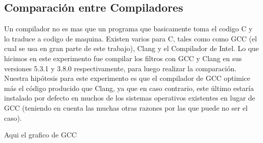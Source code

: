 \subsection{Comparación entre Compiladores}
Un compilador no es mas que un programa que basicamente toma el codigo C
y lo traduce a codigo de maquina. Existen varios para C, tales como como GCC (el cual se usa en gran parte de este trabajo), Clang y el Compilador de Intel.
Lo que hicimos en este experimento fue compilar los filtros con GCC y Clang en sus versiones 5.3.1 y 3.8.0 respectivamente, para luego realizar la comparación.
Nuestra hipótesis para este experimento es que el compilador de GCC optimice más el código producido que Clang, ya que en caso contrario, este último estaría instalado por defecto
en muchos de los sistemas operativos existentes en lugar de GCC (teniendo en cuenta las muchas otras razones por las que puede no ser el caso).


Aqui el grafico de GCC

\begin{figure}[H]
    \centering
    \begin{floatrow}
    \end{floatrow}
\end{figure}


